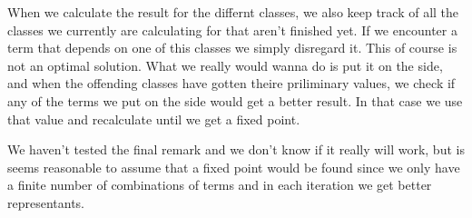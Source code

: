 When we calculate the result for the differnt classes, we also keep track of all
the classes we currently are calculating for that aren't finished yet. If we encounter
a term that depends on one of this classes we simply disregard it. This of course
is not an optimal solution. What we really would wanna do is put it on the side,
and when the offending classes have gotten theire priliminary values, we check if
any of the terms we put on the side would get a better result. In that case we use that
value and recalculate until we get a fixed point.

We haven't tested the final remark and we don't know if it really will work, but
is seems reasonable to assume that a fixed point would be found since we only have
a finite number of combinations of terms and in each iteration we get better representants.
